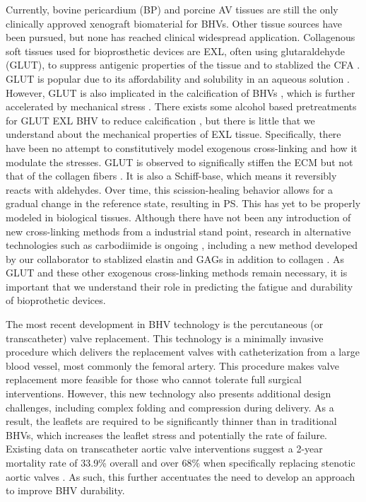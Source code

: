     
    Currently, bovine pericardium (BP) and porcine AV tissues are still the only clinically approved xenograft biomaterial for BHVs. Other tissue sources have been pursued, but none has reached clinical widespread application. Collagenous soft tissues used for bioprosthetic devices are EXL, often using glutaraldehyde (GLUT), to suppress antigenic properties of the tissue and to stablized the CFA \cite{khor_methods_1997}. GLUT is popular due to its affordability and solubility in an aqueous solution \cite{jayakrishnan_glutaraldehyde_1996}. However, GLUT is also implicated in the calcification of BHVs \cite{golomb_role_1987}, which is further accelerated by mechanical stress \cite{schoen_calcification_2005}. There exists some alcohol based pretreatments for GLUT EXL BHV to reduce calcification \cite{vyavahare_prevention_1997}, but there is little that we understand about the mechanical properties of EXL tissue. Specifically, there have been no attempt to constitutively model exogenous cross-linking and how it modulate the stresses. GLUT is observed to significally stiffen the ECM but not that of the collagen fibers \cite{gentleman_mechanical_2003}\cite{yang_mechanical_2008,yang_micromechanical_2007}. It is also a Schiff-base, which means it reversibly reacts with aldehydes. Over time, this scission-healing behavior allows for a gradual change in the reference state, resulting in PS. This has yet to be properly modeled in biological tissues. Although there have not been any introduction of new cross-linking methods from a industrial stand point, research in alternative technologies such as carbodiimide is ongoing \cite{sung_crosslinking_2003,billiar_effects_2001,kemp_effects_1995}, including a new method developed by our collaborator to stablized elastin and GAGs in addition to collagen \cite{tam_novel_2015}. As GLUT and these other exogenous cross-linking methods remain necessary, it is important that we understand their role in predicting the fatigue and durability of bioprothetic devices.
    
    
    The most recent development in BHV technology is the percutaneous (or transcatheter) valve replacement. This technology is a minimally invasive procedure which delivers the replacement valves with catheterization from a large blood vessel, most commonly the femoral artery. This procedure makes valve replacement more feasible for those who cannot tolerate full surgical interventions. However, this new technology also presents additional design challenges, including complex folding and compression during delivery. As a result, the leaflets are required to be significantly thinner than in traditional BHVs, which increases the leaflet stress and potentially the rate of failure. Existing data on transcatheter aortic valve interventions suggest a 2-year mortality rate of 33.9\% overall \cite{mozaffarian_heart_2016} and over 68\% when specifically replacing stenotic aortic valves \cite{makkar_transcatheter_2012}. As such, this further accentuates the need to develop an approach to improve BHV durability. 
    
